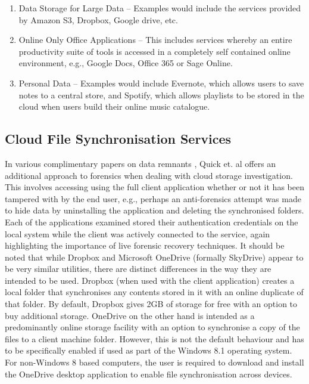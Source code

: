 \documentclass[final,5p,times,twocolumn]{elsarticle}
\begin{document}
\begin{enumerate}
\item Data Storage for Large Data -- Examples would include the services provided by Amazon S3, Dropbox, Google drive, etc.
\item Online Only Office Applications -- This includes services whereby an entire productivity suite of tools is accessed in a completely self contained online environment, e.g., Google Docs, Office 365 or Sage Online.
\item Personal Data -- Examples would include Evernote, which allows users to save notes to a central store, and Spotify, which allows playlists to be stored in the cloud when users build their online music catalogue.
\end{enumerate}

\subsection{Cloud File Synchronisation Services}
\label{cloudforensics}

In various complimentary papers on data remnants \cite{Quick2013266, Quick2013, quick2013digital}, Quick et. al offers an additional approach to forensics when dealing with cloud storage investigation. This involves accessing using the full client application whether or not it has been tampered with by the end user, e.g., perhaps an anti-forensics attempt was made to hide data by uninstalling the application and deleting the synchronised folders. Each of the applications examined stored their authentication credentials on the local system while the client was actively connected to the service, again highlighting the importance of live forensic recovery techniques. It should be noted that while Dropbox and Microsoft OneDrive (formally SkyDrive) appear to be very similar utilities, there are distinct differences in the way they are intended to be used. Dropbox (when used with the client application) creates a local folder that synchronises any contents stored in it with an online duplicate of that folder. By default, Dropbox gives 2GB of storage for free with an option to buy additional storage. OneDrive on the other hand is intended as a predominantly online storage facility with an option to synchronise a copy of the files to a client machine folder. However, this is not the default behaviour and has to be specifically enabled if used as part of the Windows 8.1 operating system. For non-Windows 8 based computers, the user is required to download and install the OneDrive desktop application to enable file synchronisation across devices.
\end{document}
